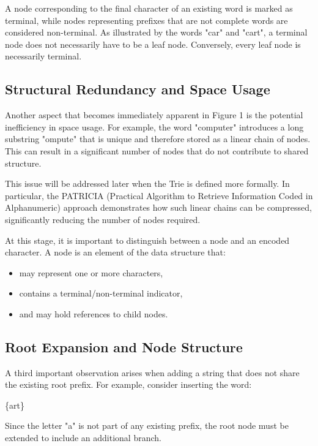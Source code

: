 \documentclass[pdflatex,sn-mathphys-num]{sn-jnl}%
\theoremstyle{thmstyleone}%
\theoremstyle{thmstyletwo}%
\theoremstyle{thmstylethree}%
\begin{document}
A node corresponding to the final character of an existing word is
marked as terminal, while nodes representing prefixes that are not
complete words are considered non-terminal. As illustrated by the words
"car" and "cart", a terminal node does not necessarily have to be a leaf
node. Conversely, every leaf node is necessarily terminal.

\subsection{Structural Redundancy and Space
Usage}\label{structural-redundancy-and-space-usage}

Another aspect that becomes immediately apparent in Figure 1 is the
potential inefficiency in space usage. For example, the word "computer"
introduces a long substring "ompute" that is unique and therefore stored
as a linear chain of nodes. This can result in a significant number of
nodes that do not contribute to shared structure.

This issue will be addressed later when the Trie is defined more
formally. In particular, the PATRICIA (Practical Algorithm to Retrieve
Information Coded in Alphanumeric) approach \cite{HIMANSHU_CHATURVEDI_BANDYOPADHYAY_JAIN_2017} demonstrates how
such linear chains can be compressed, significantly reducing the number
of nodes required.

At this stage, it is important to distinguish between a node and an
encoded character. A node is an element of the data structure that:

\begin{itemize}
\item
  may represent one or more characters,
\item
  contains a terminal/non-terminal indicator,
\item
  and may hold references to child nodes.
\end{itemize}

\subsection{Root Expansion and Node
Structure}\label{root-expansion-and-node-structure}

A third important observation arises when adding a string that does not
share the existing root prefix. For example, consider inserting the
word:

\bigskip
      \{art\}
\bigskip

Since the letter "a" is not part of any existing prefix, the root node
must be extended to include an additional branch.
\end{document}
